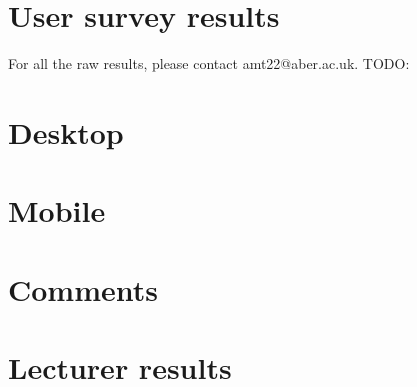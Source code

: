 \chapter{User survey results}
\label{appendix:user-results}
For all the raw results, please contact amt22@aber.ac.uk.
TODO:
\chapter{Desktop}
\chapter{Mobile}
\chapter{Comments} 
\chapter{Lecturer results}